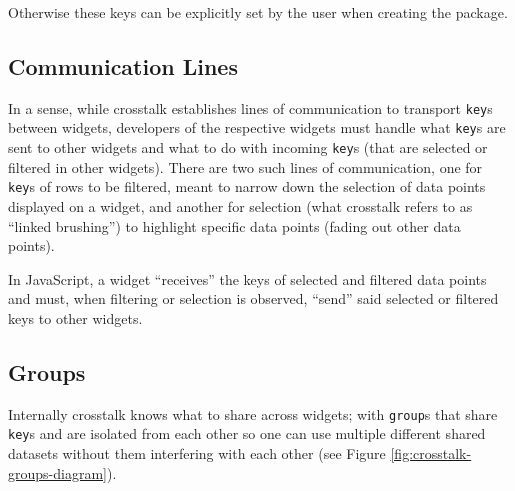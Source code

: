\documentclass[10pt,]{krantz}
\makeatletter
\newenvironment{Shaded}{\begin{snugshade}}{\end{snugshade}}
\newcommand{\CommentTok}[1]{\textcolor[rgb]{0.37,0.37,0.37}{\textit{#1}}}
\newcommand{\DataTypeTok}[1]{\textcolor[rgb]{0.27,0.27,0.27}{#1}}
\newcommand{\DecValTok}[1]{\textcolor[rgb]{0.06,0.06,0.06}{#1}}
\newcommand{\KeywordTok}[1]{\textcolor[rgb]{0.27,0.27,0.27}{\textbf{#1}}}
\newcommand{\NormalTok}[1]{#1}
\newcommand{\OperatorTok}[1]{\textcolor[rgb]{0.43,0.43,0.43}{\textbf{#1}}}
\newcommand{\StringTok}[1]{\textcolor[rgb]{0.5,0.5,0.5}{#1}}
\newenvironment{kframe}{%
\medskip{}
\setlength{\fboxsep}{.8em}
 \def\at@end@of@kframe{}%
 \ifinner\ifhmode%
  \def\at@end@of@kframe{\end{minipage}}%
  \begin{minipage}{\columnwidth}%
 \fi\fi%
 \def\FrameCommand##1{\hskip\@totalleftmargin \hskip-\fboxsep
 \colorbox{shadecolor}{##1}\hskip-\fboxsep
     \hskip-\linewidth \hskip-\@totalleftmargin \hskip\columnwidth}%
 \MakeFramed {\advance\hsize-\width
   \@totalleftmargin\z@ \linewidth\hsize
   \@setminipage}}%
 {\par\unskip\endMakeFramed%
 \at@end@of@kframe}
\renewenvironment{Shaded}{\begin{kframe}}{\end{kframe}}
\makeatother
\begin{document}
Otherwise these keys can be explicitly set by the user when creating the package.

\begin{Shaded}
\end{Shaded}

\hypertarget{linking-widgets-communication-lines}{%
\subsection{Communication Lines}\label{linking-widgets-communication-lines}}

In a sense, while crosstalk establishes lines of communication to transport \texttt{key}s between widgets, developers of the respective widgets must handle what \texttt{key}s are sent to other widgets and what to do with incoming \texttt{key}s (that are selected or filtered in other widgets). There are two such lines of communication, one for \texttt{key}s of rows to be filtered, meant to narrow down the selection of data points displayed on a widget, and another for selection (what crosstalk refers to as ``linked brushing'') to highlight specific data points (fading out other data points).

In JavaScript, a widget ``receives'' the keys of selected and filtered data points and must, when filtering or selection is observed, ``send'' said selected or filtered keys to other widgets.

\hypertarget{linking-widgets-groups}{%
\subsection{Groups}\label{linking-widgets-groups}}

Internally crosstalk knows what to share across widgets; with \texttt{group}s that share \texttt{key}s and are isolated from each other so one can use multiple different shared datasets without them interfering with each other (see Figure \ref{fig:crosstalk-groups-diagram}).
\end{document}
